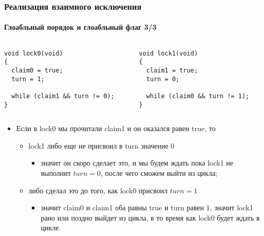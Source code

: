 \begin{frame}[fragile]
\frametitle{Реализация взаимного исключения}
\framesubtitle{Глоабльный порядок и глоабльный флаг 3/3}
\begin{columns}
  \begin{column}{.45\linewidth}
    \begin{lstlisting}
void lock0(void)
{
  claim0 = true;
  turn = 1;

  while (claim1 && turn != 0);
}
    \end{lstlisting}
  \end{column}
  \begin{column}{.45\linewidth}
    \begin{lstlisting}
void lock1(void)
{
  claim1 = true;
  turn = 0;

  while (claim0 && turn != 1);
}
    \end{lstlisting}
  \end{column}
\end{columns}
\begin{itemize}
  \item Если в lock0 мы прочитали claim1 и он оказался равен true, то
  \begin{itemize}
    \item lock1 либо еще не присвоил в turn значение 0
    \begin{itemize}
      \item значит он скоро сделает это, и мы будем ждать пока lock1 не выполнит
      $turn = 0$, после чего сможем выйти из цикла;
    \end{itemize}
    \item либо сделал это до того, как lock0 присвоил $turn = 1$
    \begin{itemize}
      \item значит claim0 и claim1 оба равны true и turn равен 1, значит lock1
      рано или поздно выйдет из цикла, в то время как lock0 будет ждать в цикле.
    \end{itemize}
  \end{itemize}
\end{itemize}
\end{frame}

